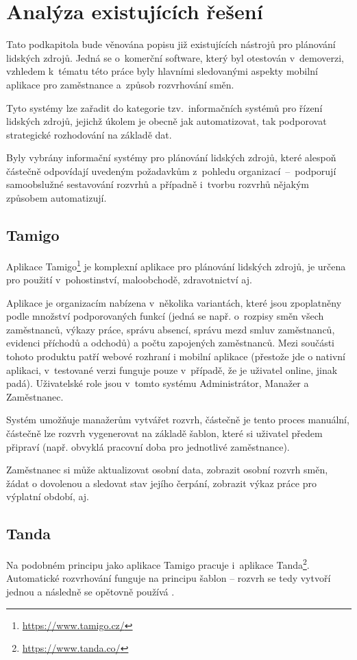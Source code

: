 \documentclass[twoside]{ctuthesis}
\begin{document}
\section{Analýza existujících řešení}
\label{sec:existing}
Tato podkapitola bude věnována popisu již existujících nástrojů pro plánování lidských zdrojů. Jedná se o~komerční software, který byl otestován v~demoverzi, vzhledem k~tématu této práce byly hlavními sledovanými aspekty mobilní aplikace pro zaměstnance a~způsob rozvrhování směn.

Tyto systémy lze zařadit do kategorie tzv.~informačních systémů pro řízení lidských zdrojů, jejichž úkolem je obecně jak automatizovat, tak podporovat strategické rozhodování na základě dat. \cite{kovach2002administrative}

Byly vybrány informační systémy pro plánování lidských zdrojů, které alespoň částečně odpovídají uvedeným požadavkům z~pohledu organizací~–~podporují samoobslužné sestavování rozvrhů a případně i~tvorbu rozvrhů nějakým způsobem automatizují.

\subsection{Tamigo}
Aplikace Tamigo\footnote{\url{https://www.tamigo.cz/}} je komplexní aplikace pro plánování lidských zdrojů, je určena pro použití v~pohostinství, maloobchodě, zdravotnictví aj. \cite{tamigo2020reseni}

Aplikace je organizacím nabízena v~několika variantách, které jsou zpop\-lat\-ně\-ny podle množství podporovaných funkcí (jedná se např. o~rozpisy směn všech zaměstnanců, výkazy práce, správu absencí, správu mezd smluv zaměstnanců, evidenci příchodů a odchodů) a počtu zapojených zaměstnanců. Mezi součásti tohoto produktu patří webové rozhraní i mobilní aplikace (přestože jde o nativní aplikaci, v~testované verzi funguje pouze v~případě, že je uživatel online, jinak padá). Uživatelské role jsou v~tomto systému Administrátor, Manažer a Zaměstnanec.

Systém umožňuje manažerům vytvářet rozvrh, částečně je tento proces manuální, částečně lze rozvrh vygenerovat na základě šablon, které si uživatel předem připraví (např. obvyklá pracovní doba pro jednotlivé zaměstnance).

Za\-měst\-na\-nec si může aktualizovat osobní data, zobrazit osobní rozvrh směn, žádat o dovolenou a sledovat stav jejího čerpání, zobrazit výkaz práce pro výplatní období, aj.

\subsection{Tanda}
Na podobném principu jako aplikace Tamigo pracuje i~aplikace Tanda\footnote{\url{https://www.tanda.co/}}. Automatické rozvrhování funguje na principu šablon -- rozvrh se tedy vytvoří jednou a následně se opětovně používá \cite{tanda2020rosters}.
\end{document}

